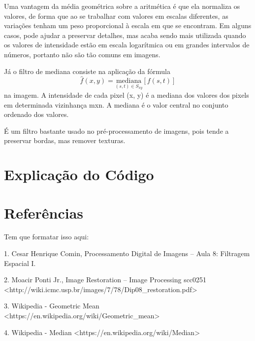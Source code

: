 \documentclass[12pt,a4paper]{article}
\begin{document}
Uma vantagem da média geométrica sobre a aritmética é que ela normaliza os valores, de forma que ao se trabalhar com valores em escalas diferentes, as variações tenham um peso proporcional à escala em que se encontram. Em alguns casos, pode ajudar a preservar detalhes, mas acaba sendo mais utilizada quando os valores de intensidade estão em escala logarítmica ou em grandes intervalos de números, portanto não são tão comuns em imagens.

Já o filtro de mediana consiste na aplicação da fórmula $$ \hat{f}(x,y) = \underset{(s,t)\in S_{xy}}{\mathrm{mediana}} [f(s,t)] $$ na imagem. A intensidade de cada pixel (x, y) é a mediana dos valores dos pixels em determinada vizinhança mxn. A mediana é o valor central no conjunto ordenado dos valores.

É um filtro bastante usado no pré-processamento de imagens, pois tende a preservar bordas, mas remover texturas.

\section{Explicação do Código}

\section{Referências}

Tem que formatar isso aqui:

1. Cesar Henrique Comin, Processamento Digital de Imagens – Aula 8: Filtragem Espacial I.

2. Moacir Ponti Jr., Image Restoration – Image Processing scc0251 <http://wiki.icmc.usp.br/images/7/78/Dip08\_restoration.pdf>

3. Wikipedia - Geometric Mean <https://en.wikipedia.org/wiki/Geometric\_mean>

4. Wikipedia - Median <https://en.wikipedia.org/wiki/Median>
\end{document}
